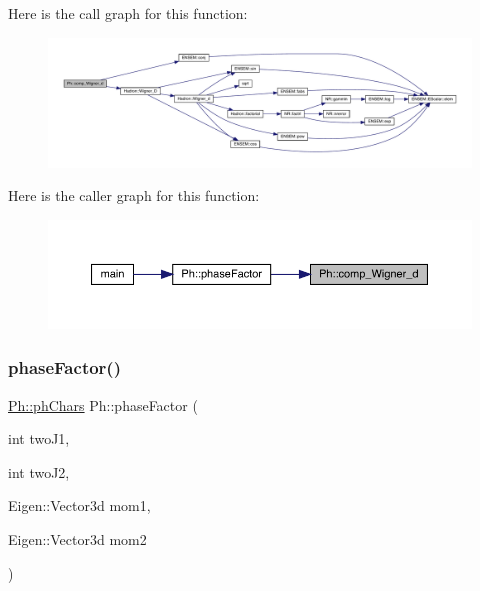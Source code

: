 Here is the call graph for this function\+:\nopagebreak
\begin{figure}[H]
\begin{center}
\leavevmode
\includegraphics[width=350pt]{d6/d3c/namespacePh_a47fd4e2846a9ce86464940bc5f4cccf8_cgraph}
\end{center}
\end{figure}
Here is the caller graph for this function\+:
\nopagebreak
\begin{figure}[H]
\begin{center}
\leavevmode
\includegraphics[width=350pt]{d6/d3c/namespacePh_a47fd4e2846a9ce86464940bc5f4cccf8_icgraph}
\end{center}
\end{figure}
\mbox{\label{namespacePh_a51140cf285f02c028134a1e40807b54b}} 
\subsubsection{\texorpdfstring{phaseFactor()}{phaseFactor()}\hspace{0.1cm}{\footnotesize\ttfamily [1/2]}}
{\footnotesize\ttfamily \mbox{\hyperlink{structPh_1_1phChars}{Ph\+::ph\+Chars}} Ph\+::phase\+Factor (\begin{DoxyParamCaption}\item[{int}]{two\+J1,  }\item[{int}]{two\+J2,  }\item[{Eigen\+::\+Vector3d}]{mom1,  }\item[{Eigen\+::\+Vector3d}]{mom2 }\end{DoxyParamCaption})}

